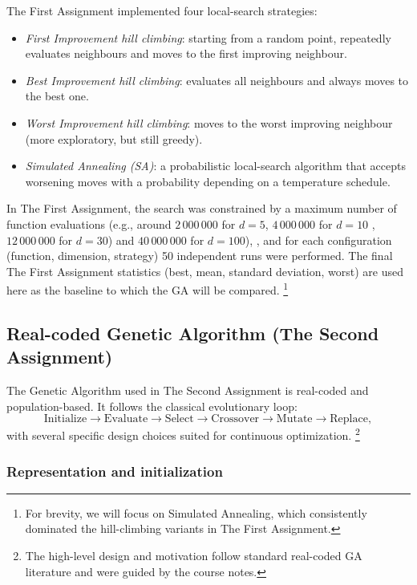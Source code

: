 \documentclass[a4paper,11pt]{article}
\begin{document}
The First Assignment implemented four local-search strategies:
\begin{itemize}
  \item \emph{First Improvement hill climbing}: starting from a random point, repeatedly
    evaluates neighbours and moves to the first improving neighbour.
  \item \emph{Best Improvement hill climbing}: evaluates all neighbours and always moves
    to the best one.
  \item \emph{Worst Improvement hill climbing}: moves to the worst improving neighbour
    (more exploratory, but still greedy).
  \item \emph{Simulated Annealing (SA)}: a probabilistic local-search algorithm that
    accepts worsening moves with a probability depending on a temperature schedule.
\end{itemize}

In The First Assignment, the search was constrained by a maximum number of function evaluations
(e.g., around $2\,000\,000$ for $d=5$, $4\,000\,000$ for $d=10$ , $12\,000\,000$
for $d=30$) and $40\,000\,000$ for $d=100$), , and for each configuration (function, dimension, strategy) 50 independent
runs were performed. The final The First Assignment statistics (best, mean, standard deviation,
worst) are used here as the baseline to which the GA will be compared.%
\footnote{For brevity, we will focus on Simulated Annealing, which consistently
dominated the hill-climbing variants in The First Assignment.}

\subsection{Real-coded Genetic Algorithm (The Second Assignment)}

The Genetic Algorithm used in The Second Assignment is real-coded and population-based. It follows the
classical evolutionary loop:
\[
  \text{Initialize} \rightarrow \text{Evaluate} \rightarrow
  \text{Select} \rightarrow \text{Crossover} \rightarrow
  \text{Mutate} \rightarrow \text{Replace},
\]
with several specific design choices suited for continuous optimization.%
\footnote{The high-level design and motivation follow standard real-coded GA
literature and were guided by the course notes.}

\subsubsection{Representation and initialization}
\end{document}
